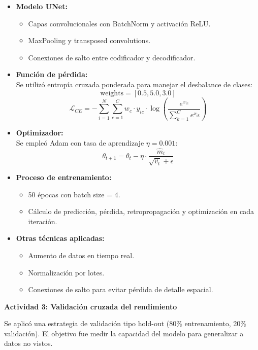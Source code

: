 \begin{itemize}
  \item \textbf{Modelo UNet:}
  \begin{itemize}
    \item Capas convolucionales con BatchNorm y activación ReLU.
    \item MaxPooling y transposed convolutions.
    \item Conexiones de salto entre codificador y decodificador.
  \end{itemize}
  
  \item \textbf{Función de pérdida:} \\
  Se utilizó entropía cruzada ponderada para manejar el desbalance de clases:
  \[
  \text{weights} = [0.5, 5.0, 3.0]
  \]
  \[
  \mathcal{L}_{CE} = - \sum_{i=1}^{N} \sum_{c=1}^{C} w_c \cdot y_{ic} \cdot \log \left( \frac{e^{x_{ic}}}{\sum_{k=1}^{C} e^{x_{ik}}} \right)
  \]

  \item \textbf{Optimizador:} \\
  Se empleó Adam con tasa de aprendizaje $\eta = 0.001$:
  \[
  \theta_{t+1} = \theta_t - \eta \cdot \frac{\hat{m}_t}{\sqrt{\hat{v}_t} + \epsilon}
  \]

  \item \textbf{Proceso de entrenamiento:}
  \begin{itemize}
    \item 50 épocas con batch size = 4.
    \item Cálculo de predicción, pérdida, retropropagación y optimización en cada iteración.
  \end{itemize}

  \item \textbf{Otras técnicas aplicadas:}
  \begin{itemize}
    \item Aumento de datos en tiempo real.
    \item Normalización por lotes.
    \item Conexiones de salto para evitar pérdida de detalle espacial.
  \end{itemize}
\end{itemize}

\vspace{0.5cm}
\textbf{Actividad 3: Validación cruzada del rendimiento}

Se aplicó una estrategia de validación tipo hold-out (80\% entrenamiento, 20\% validación). El objetivo fue medir la capacidad del modelo para generalizar a datos no vistos.

